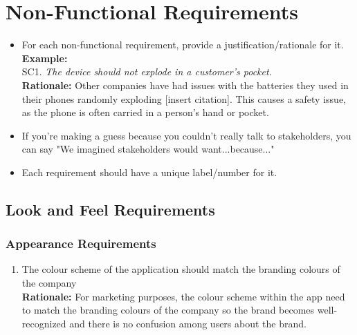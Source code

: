 \documentclass[]{article}
\begin{document}

\section{Non-Functional Requirements}
\label{sec:non-functional_requirements}


\begin{itemize}
	\item For each non-functional requirement, provide a justification/rationale for it.\\
	{\bf Example:} \\
	SC1. \emph{The device should not explode in a customer’s pocket.}\\
	{\bf Rationale:} Other companies have had issues with the batteries they used in their phones randomly exploding [insert citation]. This causes a safety issue, as the phone is often carried in a person's hand or pocket.	
	\item If you're making a guess because you couldn't really talk to stakeholders, you can say "We imagined stakeholders would want...because..."
	\item Each requirement should have a unique label/number for it.
\end{itemize}

\subsection{Look and Feel Requirements}
\label{sub:look_and_feel_requirements}

\subsubsection{Appearance Requirements}
\label{ssub:appearance_requirements}
\begin{enumerate}[{LF-A}1. ]
	\item The colour scheme of the application should match the branding colours of the company \\
	{\bf Rationale:} For marketing purposes, the colour scheme within the app need to match the branding colours of the company so the brand becomes well-recognized and there is no confusion among users about the brand.
\end{enumerate}
\end{document}
